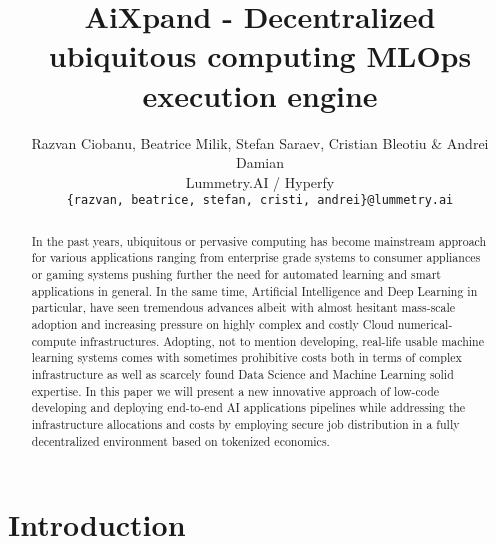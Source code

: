 \documentclass{article}
\title{
AiXpand - Decentralized ubiquitous computing MLOps execution engine
}
\author{
  Razvan Ciobanu, Beatrice Milik, Stefan Saraev, Cristian Bleotiu \& Andrei Damian \\
  Lummetry.AI / Hyperfy\\
  \texttt{\{razvan, beatrice, stefan, cristi, andrei\}@lummetry.ai} \\
}
\begin{document}
\maketitle


\begin{abstract}
In the past years, ubiquitous or pervasive computing has become mainstream approach for various applications ranging from enterprise grade systems to consumer appliances or gaming systems pushing further the need for automated learning and smart applications in general. In the same time, Artificial Intelligence and Deep Learning in particular, have seen tremendous advances albeit with almost hesitant mass-scale adoption and increasing pressure on highly complex and costly Cloud numerical-compute infrastructures. Adopting, not to mention developing, real-life usable machine learning systems comes with sometimes prohibitive costs both in terms of complex infrastructure as well as scarcely found Data Science and Machine Learning solid expertise. In this paper we will present a new innovative approach of low-code developing and deploying end-to-end AI applications pipelines while addressing the infrastructure allocations and costs by employing secure job distribution in a fully decentralized environment based on tokenized economics. 
\end{abstract}



\section{Introduction}
\end{document}
